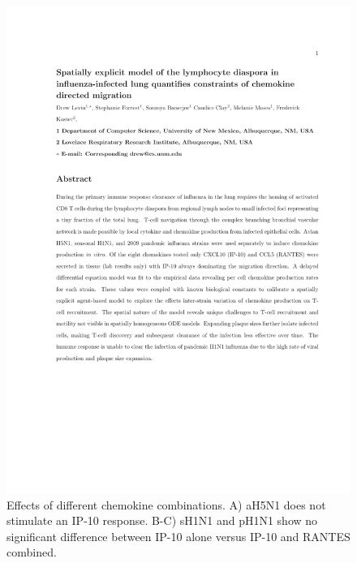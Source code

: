 \documentclass[10pt]{article}
\begin{document}
\begin{figure}[ht!]
\begin{center}
	\includegraphics[width=\textwidth]{chemokine}
	\caption{Effects of different chemokine combinations.  A) aH5N1 does not stimulate an IP-10 response.  B-C) sH1N1 and pH1N1 show no significant difference between IP-10 alone versus IP-10 and RANTES combined.}
	\label{fig:chemokine}
\end{center}
\end{figure}







\end{document}
